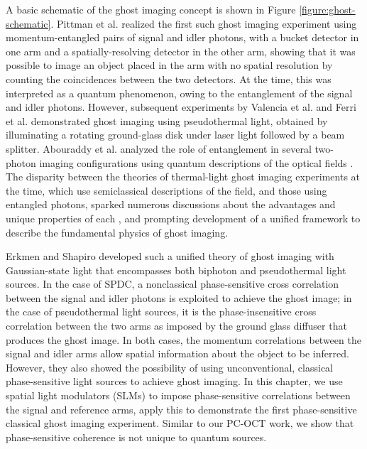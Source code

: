 A basic schematic of the ghost imaging concept is shown in Figure \ref{figure:ghost-schematic}. Pittman et al. realized the first such ghost imaging experiment \cite{pittman-ghost} using momentum-entangled pairs of signal and idler photons, with a bucket detector in one arm and a spatially-resolving detector in the other arm, showing that it was possible to image an object placed in the arm with no spatial resolution by counting the coincidences between the two detectors. At the time, this was interpreted as a quantum phenomenon, owing to the entanglement of the signal and idler photons. However, subsequent experiments by Valencia et al. \cite{valencia-two} and Ferri et al. \cite{ferri-high} demonstrated ghost imaging using pseudothermal light, obtained by illuminating a rotating ground-glass disk under laser light followed by a beam splitter. Abouraddy et al. analyzed the role of entanglement in several two-photon imaging configurations using quantum descriptions of the optical fields \cite{abouraddy-role,abouraddy-fourier}. The disparity between the theories of thermal-light ghost imaging experiments at the time, which use semiclassical descriptions of the field, and those using entangled photons, sparked numerous discussions about the advantages and unique properties of each \cite{dangelo-identifying,bennink-quantum,gatti-entangled}, and prompting development of a unified framework to describe the fundamental physics of ghost imaging.

Erkmen and Shapiro developed such a unified theory of ghost imaging with Gaussian-state light \cite{erkmen-unified} that encompasses both biphoton and pseudothermal light sources. In the case of SPDC, a nonclassical phase-sensitive cross correlation between the signal and idler photons is exploited to achieve the ghost image; in the case of pseudothermal light sources, it is the phase-insensitive cross correlation between the two arms as imposed by the ground glass diffuser that produces the ghost image. In both cases, the momentum correlations between the signal and idler arms allow spatial information about the object to be inferred. However, they also showed the possibility of using unconventional, classical phase-sensitive light sources to achieve ghost imaging. In this chapter, we use spatial light modulators (SLMs) to impose phase-sensitive correlations between the signal and reference arms, apply this to demonstrate the first phase-sensitive classical ghost imaging experiment. Similar to our PC-OCT work, we show \cite{venkatraman-classical} that phase-sensitive coherence is not unique to quantum sources.


